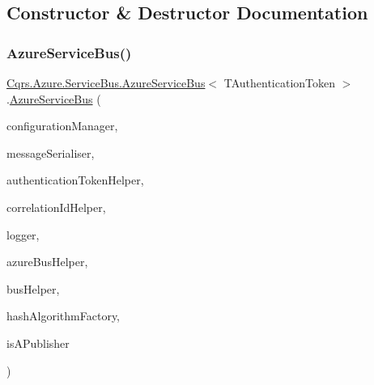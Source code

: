 \subsection{Constructor \& Destructor Documentation}
\mbox{\label{classCqrs_1_1Azure_1_1ServiceBus_1_1AzureServiceBus_a09e34bafdb96fb8136efa428df9f80b2_a09e34bafdb96fb8136efa428df9f80b2}} 
\subsubsection{\texorpdfstring{Azure\+Service\+Bus()}{AzureServiceBus()}}
{\footnotesize\ttfamily \hyperlink{classCqrs_1_1Azure_1_1ServiceBus_1_1AzureServiceBus}{Cqrs.\+Azure.\+Service\+Bus.\+Azure\+Service\+Bus}$<$ T\+Authentication\+Token $>$.\hyperlink{classCqrs_1_1Azure_1_1ServiceBus_1_1AzureServiceBus}{Azure\+Service\+Bus} (\begin{DoxyParamCaption}\item[{\hyperlink{interfaceCqrs_1_1Configuration_1_1IConfigurationManager}{I\+Configuration\+Manager}}]{configuration\+Manager,  }\item[{\hyperlink{interfaceCqrs_1_1Azure_1_1ServiceBus_1_1IMessageSerialiser}{I\+Message\+Serialiser}$<$ T\+Authentication\+Token $>$}]{message\+Serialiser,  }\item[{\hyperlink{interfaceCqrs_1_1Authentication_1_1IAuthenticationTokenHelper}{I\+Authentication\+Token\+Helper}$<$ T\+Authentication\+Token $>$}]{authentication\+Token\+Helper,  }\item[{I\+Correlation\+Id\+Helper}]{correlation\+Id\+Helper,  }\item[{I\+Logger}]{logger,  }\item[{\hyperlink{interfaceCqrs_1_1Azure_1_1ServiceBus_1_1IAzureBusHelper}{I\+Azure\+Bus\+Helper}$<$ T\+Authentication\+Token $>$}]{azure\+Bus\+Helper,  }\item[{\hyperlink{interfaceCqrs_1_1Bus_1_1IBusHelper}{I\+Bus\+Helper}}]{bus\+Helper,  }\item[{\hyperlink{interfaceCqrs_1_1Bus_1_1IHashAlgorithmFactory}{I\+Hash\+Algorithm\+Factory}}]{hash\+Algorithm\+Factory,  }\item[{bool}]{is\+A\+Publisher }\end{DoxyParamCaption})\hspace{0.3cm}{\ttfamily [protected]}}




